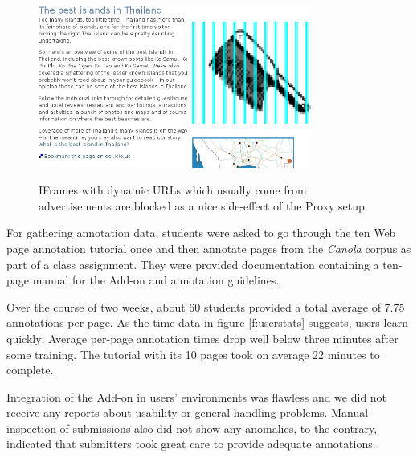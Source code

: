 \begin{figure}
	{\includegraphics[width=0.8\textwidth]{add}}
\caption{\label{f:iframes}IFrames with dynamic URLs which usually come from advertisements are blocked as a nice side-effect of the Proxy setup.}
\end{figure}

For gathering annotation data, students were asked to go through the ten Web page annotation tutorial once and then annotate pages from the \textit{Canola} corpus as part of a class assignment.
They were provided documentation containing a ten-page manual for the Add-on and annotation guidelines.

Over the course of two weeks, about 60 students provided a total average of 7.75 annotations per page.
As the time data in figure \ref{f:userstats} suggests, users learn quickly; 
Average per-page annotation times drop well below three minutes after some training.
The tutorial with its 10 pages took on average 22 minutes to complete.

Integration of the Add-on in users' environments was flawless and we did not receive any reports about usability or general handling problems.
Manual inspection of submissions also did not show any anomalies, to the contrary, indicated that submitters took great care to provide adequate annotations.

